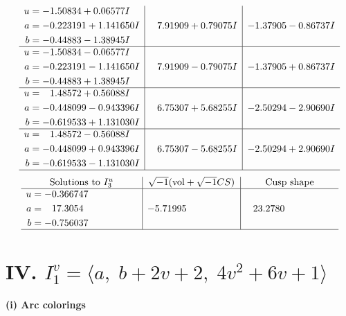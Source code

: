 \documentclass[1p]{elsarticle_modified}
\theoremstyle{definition}
\newcommand{\I}{\sqrt{-1}}
\begin{document}
$$\begin{array}{c|c|c}
\begin{aligned}
u &= -1.50834 + 0.06577 I \\
a &= -0.223191 + 1.141650 I \\
b &= -0.44883 - 1.38945 I\end{aligned}
 & \phantom{-}7.91909 + 0.79075 I & -1.37905 - 0.86737 I \\ \hline\begin{aligned}
u &= -1.50834 - 0.06577 I \\
a &= -0.223191 - 1.141650 I \\
b &= -0.44883 + 1.38945 I\end{aligned}
 & \phantom{-}7.91909 - 0.79075 I & -1.37905 + 0.86737 I \\ \hline\begin{aligned}
u &= \phantom{-}1.48572 + 0.56088 I \\
a &= -0.448099 - 0.943396 I \\
b &= -0.619533 + 1.131030 I\end{aligned}
 & \phantom{-}6.75307 + 5.68255 I & -2.50294 - 2.90690 I \\ \hline\begin{aligned}
u &= \phantom{-}1.48572 - 0.56088 I \\
a &= -0.448099 + 0.943396 I \\
b &= -0.619533 - 1.131030 I\end{aligned}
 & \phantom{-}6.75307 - 5.68255 I & -2.50294 + 2.90690 I\\
 \hline 
 \end{array}$$\newpage$$\begin{array}{c|c|c}  
\text{Solutions to }I^u_{3}& \I (\text{vol} + \sqrt{-1}CS) & \text{Cusp shape}\\
 \hline 
\begin{aligned}
u &= -0.366747\phantom{ +0.000000I} \\
a &= \phantom{-}17.3054\phantom{ +0.000000I} \\
b &= -0.756037\phantom{ +0.000000I}\end{aligned}
 & -5.71995\phantom{ +0.000000I} & \phantom{-}23.2780\phantom{ +0.000000I}\\
 \hline 
 \end{array}$$\newpage\newpage\renewcommand{\arraystretch}{1}
\centering \section*{IV. $I^v_{1}= \langle a,\;b+2 v+2,\;4 v^2+6 v+1 \rangle$}
\flushleft \textbf{(i) Arc colorings}\\
\end{document}
